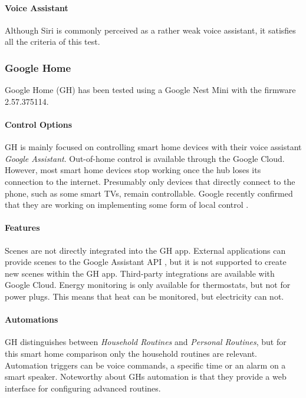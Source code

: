 \paragraph{Voice Assistant}
Although Siri is commonly perceived as a rather weak voice assistant, it satisfies all the criteria of this test.

\newpage
\subsubsection{Google Home}
Google Home (GH) has been tested using a Google Nest Mini with the firmware 2.57.375114.

\paragraph{Control Options}
GH is mainly focused on controlling smart home devices with their voice assistant \textit{Google Assistant}.
Out-of-home control is available through the Google Cloud. However, most smart home devices stop working once the hub loses its connection to the internet. Presumably only devices that directly connect to the phone, such as some smart TVs, remain controllable. Google recently confirmed that they are working on implementing some form of local control \cite{Reddit_r/GoogleHome2023OfflineMode}.

\paragraph{Features}
Scenes are not directly integrated into the GH app. External applications can provide scenes to the Google Assistant API \cite{GoogleDeveloper2023ScenesGuide}, but it is not supported to create new scenes within the GH app. Third-party integrations are available with Google Cloud. Energy monitoring is only available for thermostats, but not for power plugs. This means that heat can be monitored, but electricity can not.

\paragraph{Automations}
GH distinguishes between \textit{Household Routines} and \textit{Personal Routines}, but for this smart home comparison only the household routines are relevant. Automation triggers can be voice commands, a specific time or an alarm on a smart speaker. Noteworthy about GHs automation is that they provide a web interface for configuring advanced routines.

